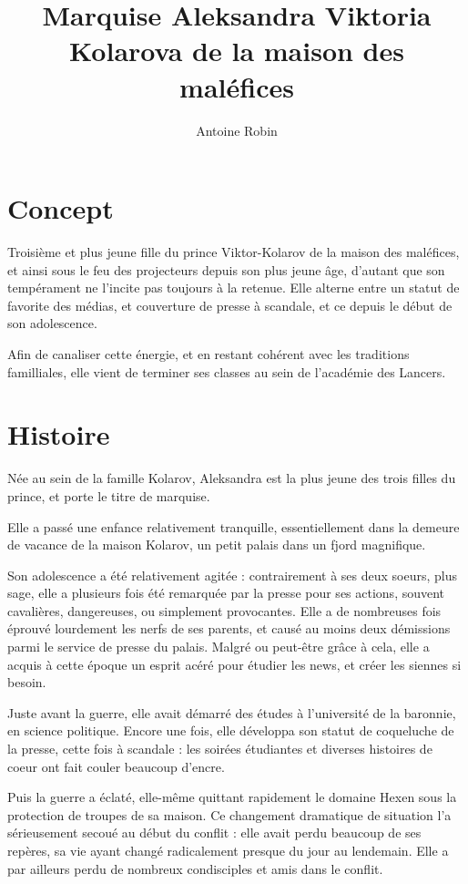 \documentclass[10pt,a4paper]{article}
\author{ Antoine Robin}
\title{Marquise Aleksandra Viktoria Kolarova de la maison des maléfices}
\begin{document}
\maketitle
\section{Concept}
Troisième et plus jeune fille du prince Viktor-Kolarov de la maison des maléfices, et ainsi sous le feu des projecteurs depuis son plus jeune âge, d'autant que son tempérament ne l'incite pas toujours à la retenue. Elle alterne entre un statut de favorite des médias, et couverture de presse à scandale, et ce depuis le début de son adolescence.

Afin de canaliser cette énergie, et en restant cohérent avec les traditions familliales, elle vient de terminer ses classes au sein de l'académie des Lancers.
\section{Histoire}
Née au sein de la famille Kolarov, Aleksandra est la plus jeune des trois filles du prince, et porte le titre de marquise. 

Elle a passé une enfance relativement tranquille, essentiellement dans la demeure de vacance de la maison Kolarov, un petit palais dans un fjord magnifique.

Son adolescence a été relativement agitée : contrairement à ses deux soeurs, plus sage, elle a plusieurs fois été remarquée par la presse pour ses actions, souvent cavalières, dangereuses, ou simplement provocantes. Elle a de nombreuses fois éprouvé lourdement les nerfs de ses parents, et causé au moins deux démissions parmi le service de presse du palais. Malgré ou peut-être grâce à cela, elle a acquis à cette époque un esprit acéré pour étudier les news, et créer les siennes si besoin.

Juste avant la guerre, elle avait démarré des études à l'université de la baronnie, en science politique. Encore une fois, elle développa son statut de coqueluche de la presse, cette fois à scandale : les soirées étudiantes et diverses histoires de coeur ont fait couler beaucoup d'encre.

Puis la guerre a éclaté, elle-même quittant rapidement le domaine Hexen sous la protection de troupes de sa maison. Ce changement dramatique de situation l'a sérieusement secoué au début du conflit : elle avait perdu beaucoup de ses repères, sa vie ayant changé radicalement presque du jour au lendemain. Elle a par ailleurs perdu de nombreux condisciples et amis dans le conflit.
\end{document}
